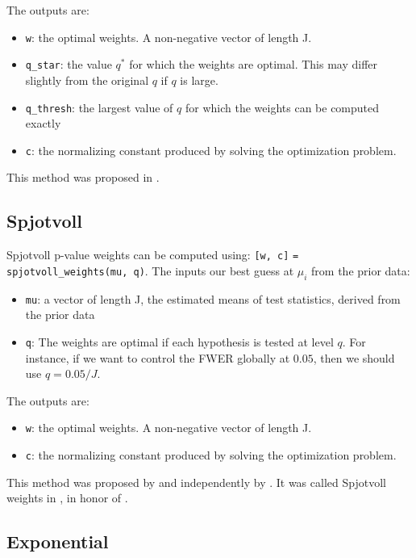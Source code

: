 \documentclass[english,11pt]{article} %
\begin{document}
The outputs are: 
\begin{itemize}
\item \verb+w+:  the optimal weights. A non-negative vector of length J.
\item \verb+q_star+: the value $q^*$ for which the weights are optimal. This may differ slightly from the original $q$ if $q$ is large.
\item \verb+q_thresh+: the largest value of $q$ for which the weights can be computed exactly 
\item \verb+c+:  the normalizing constant produced by solving the optimization problem.
\end{itemize}

This method was proposed in \cite{dobriban2015optimal}.

\subsection{Spjotvoll}


Spjotvoll p-value weights can be computed using:  \verb+[w, c]+ \verb+= spjotvoll_weights(mu, q)+. The inputs our best guess at $\mu_i$ from the prior data:

\begin{itemize}
\item \verb+mu+:  a vector of length J, the estimated means of test statistics, derived from the prior data
\item \verb+q+: The weights are optimal if each hypothesis is tested at level $q$. For instance, if we want to control the FWER globally at $0.05$, then we should use $q = 0.05/J$.
\end{itemize}

The outputs are: 
\begin{itemize}
\item \verb+w+:  the optimal weights. A non-negative vector of length J.
\item \verb+c+:  the normalizing constant produced by solving the optimization problem.
\end{itemize}

This method was proposed by \cite{wasserman2006weighted, roeder2009genome} and independently by \cite{rubin2006method}. It was called Spjotvoll weights in  \cite{dobriban2015optimal}, in honor of \citep{spjotvoll1972optimality}.

\subsection{Exponential}
\end{document}
